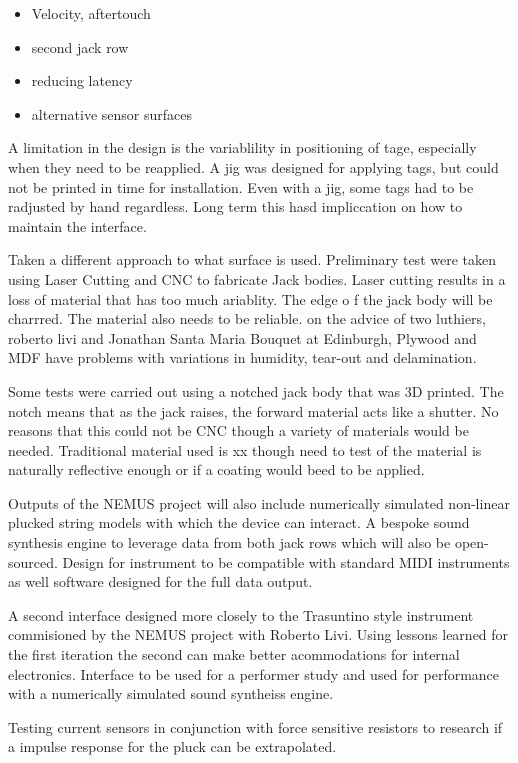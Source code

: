 \begin{itemize}
\item
  Velocity, aftertouch
\item
  second jack row
\item
  reducing latency
\item
  alternative sensor surfaces
\end{itemize}

A limitation in the design is the variablility in positioning of tage,
especially when they need to be reapplied. A jig was designed for
applying tags, but could not be printed in time for installation. Even
with a jig, some tags had to be radjusted by hand regardless. Long term
this hasd impliccation on how to maintain the interface.

Taken a different approach to what surface is used. Preliminary test
were taken using Laser Cutting and CNC to fabricate Jack bodies. Laser
cutting results in a loss of material that has too much ariablity. The
edge o f the jack body will be charrred. The material also needs to be
reliable. on the advice of two luthiers, roberto livi and Jonathan Santa
Maria Bouquet at Edinburgh, Plywood and MDF have problems with
variations in humidity, tear-out and delamination.

Some tests were carried out using a notched jack body that was 3D
printed. The notch means that as the jack raises, the forward material
acts like a shutter. No reasons that this could not be CNC though a
variety of materials would be needed. Traditional material used is xx
though need to test of the material is naturally reflective enough or if
a coating would beed to be applied.

Outputs of the NEMUS project will also include numerically simulated
non-linear plucked string models with which the device can interact. A
bespoke sound synthesis engine to leverage data from both jack rows
which will also be open-sourced. Design for instrument to be compatible
with standard MIDI instruments as well software designed for the full
data output.

A second interface designed more closely to the Trasuntino style
instrument commisioned by the NEMUS project with Roberto Livi. Using
lessons learned for the first iteration the second can make better
acommodations for internal electronics. Interface to be used for a
performer study and used for performance with a numerically simulated
sound syntheiss engine.

Testing current sensors in conjunction with force sensitive resistors to
research if a impulse response for the pluck can be extrapolated.

